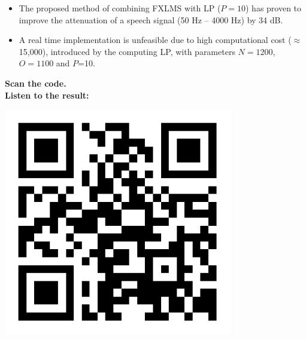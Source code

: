 \large
\begin{itemize}
	\item The proposed method of combining FXLMS with LP ($P=10$) has proven to improve the attenuation of a speech signal (50 Hz -- 4000 Hz) by 34 dB. \\
	\item A real time implementation is unfeasible due to high computational cost ($\approx$15,000), introduced by the computing LP, with parameters $N=1200$, $O=1100$ and $P$=10. \\
\end{itemize}
 \begin{minipage}{.8\columnwidth}
 	\begin{center}
	 	\textbf{Scan the code.}\\
	 	\textbf{Listen to the result:}
 	\end{center}
 \end{minipage}%
 \begin{minipage}{0.2\columnwidth}
 	\includegraphics[width=0.75\textwidth]{figures/QRCODE.pdf}
 \end{minipage}